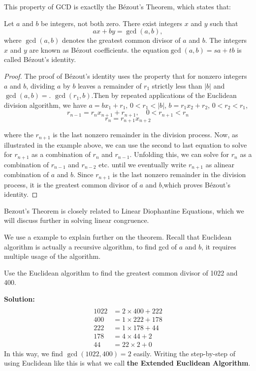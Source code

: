         This property of GCD is exactlly the Bézout's Theorem, which states that:
        \begin{theorem}\label{Bezout}
            Let $a$ and $b$ be integers, not both zero. There exist integers $x$ and $y$ such that
            \[
            ax + by = \gcd(a, b),
            \]
            where $\gcd(a, b)$ denotes the greatest common divisor of $a$ and $b$. The integers $x$ and $y$ are known as Bézout coefficients.
            the equation$ \gcd(a, b) = sa + tb$ is called Bézout's identity.
        \end{theorem}
        \begin{proof}
            The proof of Bézout's identity uses the property that for nonzero integers $a$ and $b$, dividing $a$ by 
            $b$ leaves a remainder of $r_1$ strictly less than $|b|$ and $\gcd(a,b)=$.
            $\gcd(r_1,b)$.Then by repeated applications of the Euclidean division algorithm, we have
            $a=bx_1+r_1$, $0<r_1<|b|$, $b=r_1x_2+r_2$, $0<r_2<r_1$,
            $$r_{n-1}=r_nx_{n+1}+r_{n+1},\quad0<r_{n+1}<r_n$$
            $$r_n=r_{n+1}x_{n+2}$$

            where the $r_{n+1}$ is the last nonzero remainder in the division process. Now, as illustrated in the example above, we can use the second to last equation to solve for $r_{n+1}$ as a combination of $r_n$ and $r_{n-1}$. Unfolding this, we can solve for $r_n$ as a combination of $r_{n-1}$ and $r_{n-2}$ etc. until we eventually write $r_{n+1}$ as alinear
            combination of $a$ and $b$. Since $r_{n+1}$ is the last nonzero remainder in the division process, it is the greatest common divisor of $a$ and $b$,which proves Bézout's identity.
        \end{proof}
        \begin{remark}
            Bezout's Theorem is closely related to Linear Diophantine Equations, which we will
            discuss further in solving linear congruence.
        \end{remark}

        We use a example to explain further on the theorem. Recall that Euclidean algorithm is actually a recursive algorithm, to find
        gcd of $a$ and $b$, it requires multiple usage of the algorithm.
        \begin{example} 
            Use the Euclidean algorithm to find the greatest common divisor of 1022 and 400.
        \end{example}   
        \textbf{Solution:}
$$
        \begin{aligned}\\
            1022&=2\times400+222\\
            400&=1\times 222+178\\
            222&=1\times 178+44\\
            178&=4\times 44+2\\
            44&=22\times2+0
            \end{aligned}
   $$ 
        In this way, we find $\gcd(1022,400)=2$ easily. Writing the step-by-step of using Euclidean like this is what we call \textbf{the
        Extended Euclidean Algorithm}. 

